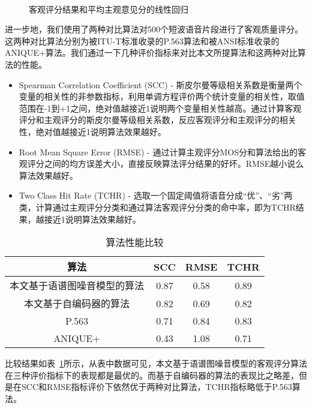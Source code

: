 \begin{figure}
\centering
{}
\vspace{0.8ex}
\\
\caption{客观评分结果和平均主观意见分的线性回归\label{fig:regress}}
\end{figure}

进一步地，我们使用了两种对比算法对500个短波语音片段进行了客观质量评分。这两种对比算法分别为被ITU-T标准收录的P.563算法和被ANSI标准收录的ANIQUE+算法。我们通过一下几种评价指标来对比本文所提算法和这两种对比算法的性能。

\begin{itemize}
\item Spearman Correlation Coefficient (SCC) - 斯皮尔曼等级相关系数是衡量两个变量的相关性的非参数指标，利用单调方程评价两个统计变量的相关性，取值范围在-1到+1之间，绝对值越接近1说明两个变量相关性越高。通过计算客观评分和主观评分的斯皮尔曼等级相关系数，反应客观评分和主观评分的相关性，绝对值越接近1说明算法效果越好。
\item Root Mean Square Error (RMSE) - 通过计算主观评分MOS分和算法给出的客观评分之间的均方误差大小，直接反映算法评分结果的好坏。RMSE越小说么算法效果越好。
\item Two Class Hit Rate (TCHR) - 选取一个固定阈值将语音分成“优”、“劣”两类，计算通过主观评分分类和通过算法客观评分分类的命中率，即为TCHR结果，越接近1说明算法效果越好。
\end{itemize}

\begin{table}
\centering
\caption{算法性能比较}
\label{tab:alg-compare}
\begin{tabular}{cccc}
\toprule[1.5pt]
算法 & SCC & RMSE & TCHR \\ \midrule[1pt]
本文基于语谱图噪音模型的算法 & 0.87 & 0.58 & 0.89 \\
本文基于自编码器的算法 & 0.82 & 0.69 & 0.82 \\
P.563 & 0.71 & 0.84 & 0.83 \\
ANIQUE+ & 0.43 & 1.08 & 0.71 \\
\end{tabular}
\end{table}

比较结果如表~\ref{tab:alg-compare}所示，从表中数据可见，本文基于语谱图噪音模型的客观评分算法在三种评价指标下的表现都是最优的。而基于自编码器的算法的表现比之略差，但是在SCC和RMSE指标评价下依然优于两种对比算法，TCHR指标略低于P.563算法。

